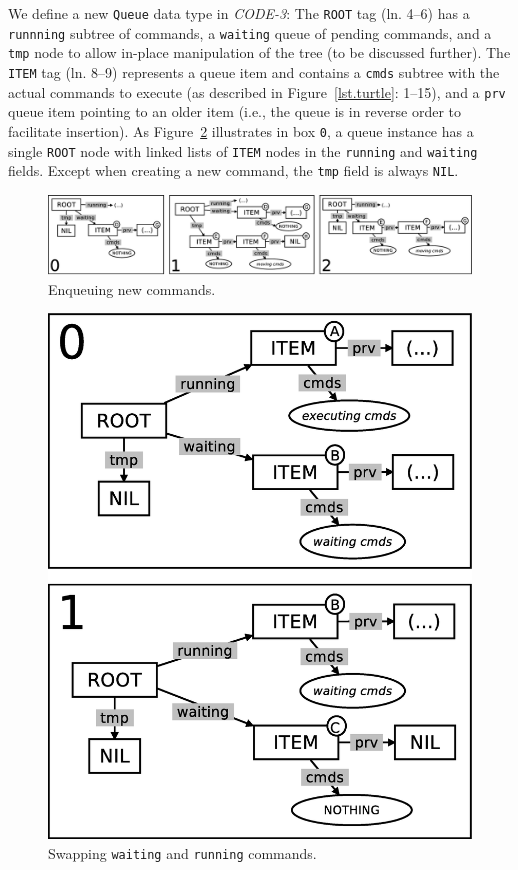 \documentclass{sig-alternate}
\newcommand{\code}[1] {{\small{\texttt{#1}}}}
\begin{document}
We define a new \code{Queue} data type in \emph{CODE-3}:
The \code{ROOT} tag (ln. 4--6) has a \code{runnning} subtree of commands, a 
\code{waiting} queue of pending commands, and a \code{tmp} node to allow 
in-place manipulation of the tree (to be discussed further).
%
The \code{ITEM} tag (ln. 8--9) represents a queue item and contains a 
\code{cmds} subtree with the actual commands to execute (as described in 
Figure~\ref{lst.turtle}: 1--15), and a \code{prv} queue item pointing to an 
older item (i.e., the queue is in reverse order to facilitate insertion).
%
As Figure~\ref{fig.queue-1} illustrates in box \code{0}, a queue instance has a 
single \code{ROOT} node with linked lists of \code{ITEM} nodes in the 
\code{running} and \code{waiting} fields.
Except when creating a new command, the \code{tmp} field is always \code{NIL}.

\begin{figure}[t]
\centering
\includegraphics[scale=0.24]{queue-fig-2.eps}
\caption{
Enqueuing new commands.
\label{fig.queue-2}
}
\end{figure}

\begin{figure}[h!]
\centering
\includegraphics[scale=0.24]{queue-fig-1.eps}
\caption{
Swapping \code{waiting} and \code{running} commands.
\label{fig.queue-1}
}
\end{figure}
\end{document}

